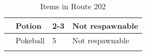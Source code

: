 \begin{longtable}{|| l l l l ||}%
\hline%
&Potion&2{-}3&Not respawnable\\%
\hline%
&Pokeball&5&Not respawnable\\%
\hline%
\endhead%
\hline%
\caption{Items in Route 202}%
\label{tab:Route202Items}%
\end{longtable}